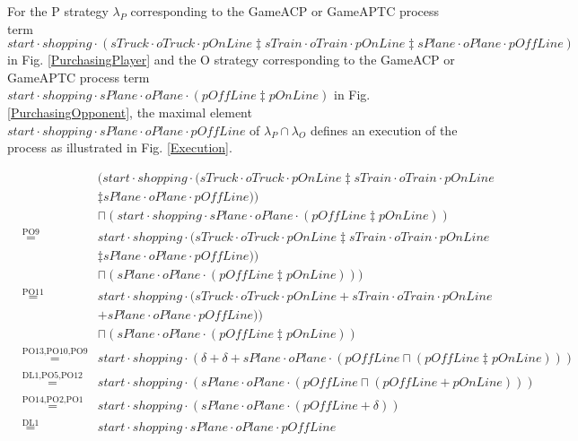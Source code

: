\documentclass{fac}
\begin{document}
For the P strategy $\lambda_P$ corresponding to the GameACP or GameAPTC process term $start\cdot shopping\cdot (sTruck\cdot oTruck\cdot pOnLine \ddagger sTrain\cdot oTrain\cdot pOnLine \ddagger sPlane \cdot oPlane \cdot pOffLine)$ in Fig. \ref{PurchasingPlayer} and the O strategy corresponding to the GameACP or GameAPTC process term $start\cdot shopping\cdot sPlane \cdot oPlane \cdot (pOffLine \ddagger pOnLine)$ in Fig. \ref{PurchasingOpponent}, the maximal element $start\cdot shopping\cdot sPlane \cdot oPlane \cdot pOffLine$ of $\lambda_P \cap \lambda_O$ defines an execution of the process as illustrated in Fig. \ref{Execution}.

\begin{eqnarray}
&&(start\cdot shopping\cdot (sTruck\cdot oTruck\cdot pOnLine \ddagger sTrain\cdot oTrain\cdot pOnLine\nonumber\\
&&\ddagger sPlane \cdot oPlane \cdot pOffLine))\nonumber\\
&&\sqcap (start\cdot shopping\cdot sPlane \cdot oPlane \cdot (pOffLine \ddagger pOnLine))\nonumber\\
&\overset{\text{PO9}}{=}&start\cdot shopping\cdot(sTruck\cdot oTruck\cdot pOnLine \ddagger sTrain\cdot oTrain\cdot pOnLine\nonumber\\
&&\ddagger sPlane \cdot oPlane \cdot pOffLine))\nonumber\\
&&\sqcap (sPlane \cdot oPlane \cdot (pOffLine \ddagger pOnLine)))\nonumber\\
&\overset{\text{PO11}}{=}&start\cdot shopping\cdot(sTruck\cdot oTruck\cdot pOnLine + sTrain\cdot oTrain\cdot pOnLine\nonumber\\
&&+ sPlane \cdot oPlane \cdot pOffLine))\nonumber\\
&&\sqcap (sPlane \cdot oPlane \cdot (pOffLine \ddagger pOnLine))\nonumber\\
&\overset{\text{PO13,PO10,PO9}}{=}&start\cdot shopping\cdot(\delta + \delta + sPlane \cdot oPlane \cdot (pOffLine \sqcap(pOffLine \ddagger pOnLine)))\nonumber\\
&\overset{\text{DL1,PO5,PO12}}{=}&start\cdot shopping\cdot(sPlane \cdot oPlane \cdot (pOffLine \sqcap(pOffLine + pOnLine)))\nonumber\\
&\overset{\text{PO14,PO2,PO1}}{=}&start\cdot shopping\cdot(sPlane \cdot oPlane \cdot (pOffLine+\delta))\nonumber\\
&\overset{\text{DL1}}{=}&start \cdot shopping \cdot sPlane \cdot oPlane \cdot pOffLine \nonumber
\end{eqnarray}
\end{document}
